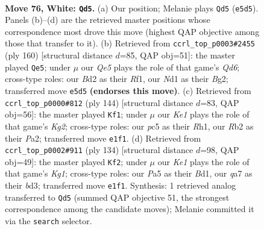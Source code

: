 \documentclass[11pt]{article}
\begin{document}
\clearpage

\begin{figure}[p]\centering
\begin{subfigure}{0.46\textwidth}\centering
\resizebox{\linewidth}{!}{%
\newchessgame
\chessboard[
  setfen={r7/q5k1/5b2/P1p1Qp2/3pnPp1/8/1R1BP3/3NK3 w - - 12 76},
  showmover=false,
  pgfstyle=straightmove, color=movearrow, markmove={e5-d5}
]}
\caption{}
\end{subfigure}\hfill
\begin{subfigure}{0.46\textwidth}\centering
\resizebox{\linewidth}{!}{%
\newchessgame
\chessboard[
  setfen={6k1/1pr1q3/2pQn1p1/P2p4/6Pp/4P2P/5PB1/5RK1 w - - 2 81},
  showmover=false,
  pgfstyle=straightmove, color=movearrow, markmove={d6-e5}
]}
\caption{}
\end{subfigure}
\\[4pt]
\begin{subfigure}{0.46\textwidth}\centering
\resizebox{\linewidth}{!}{%
\newchessgame
\chessboard[
  setfen={6k1/2pq1n2/1p2Qb2/3P1Pp1/1P6/p4BB1/P1r3K1/7R w - - 12 73},
  showmover=false,
  pgfstyle=straightmove, color=movearrow, markmove={g2-f1}
]}
\caption{}
\end{subfigure}\hfill
\begin{subfigure}{0.46\textwidth}\centering
\resizebox{\linewidth}{!}{%
\newchessgame
\chessboard[
  setfen={6k1/1p3pq1/4nQp1/2p3P1/5PPR/3b4/8/3B2K1 w - - 3 68},
  showmover=false,
  pgfstyle=straightmove, color=movearrow, markmove={g1-f2}
]}
\caption{}
\end{subfigure}
\caption{\textbf{Move 76, White: \texttt{Qd5}.} (a) Our position; Melanie plays \texttt{Qd5} (\texttt{e5d5}). Panels (b)--(d) are the retrieved master positions whose correspondence most drove this move (highest QAP objective among those that transfer to it). (b) Retrieved from \texttt{ccrl\_top\_p0003\#2455} (ply 160) [structural distance $d$=85, QAP obj=51]: the master played \texttt{Qe5}; under $\mu$ our \emph{Qe5} plays the role of that game's \emph{Qd6}; cross-type roles: our \emph{B}d2 as their \emph{R}f1, our \emph{N}d1 as their \emph{B}g2; transferred move \texttt{e5d5} \textbf{(endorses this move)}. (c) Retrieved from \texttt{ccrl\_top\_p0000\#812} (ply 144) [structural distance $d$=83, QAP obj=56]: the master played \texttt{Kf1}; under $\mu$ our \emph{Ke1} plays the role of that game's \emph{Kg2}; cross-type roles: our \emph{p}c5 as their \emph{R}h1, our \emph{R}b2 as their \emph{P}a2; transferred move \texttt{e1f1}. (d) Retrieved from \texttt{ccrl\_top\_p0002\#911} (ply 134) [structural distance $d$=98, QAP obj=49]: the master played \texttt{Kf2}; under $\mu$ our \emph{Ke1} plays the role of that game's \emph{Kg1}; cross-type roles: our \emph{P}a5 as their \emph{B}d1, our \emph{q}a7 as their \emph{b}d3; transferred move \texttt{e1f1}. Synthesis: 1 retrieved analog transferred to \texttt{Qd5} (summed QAP objective 51, the strongest correspondence among the candidate moves); Melanie committed it via the \texttt{search} selector.}
\label{fig:thought-m150}
\end{figure}
\end{document}
